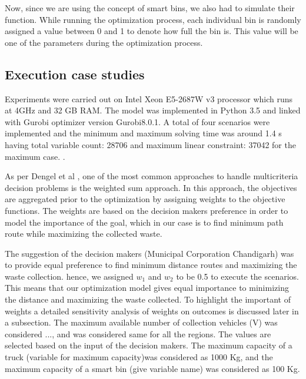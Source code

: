 \documentclass[12pt]{article}
\begin{document}
Now, since we are using the concept of smart bins, we also had to simulate their function. While running the optimization process, each individual bin is randomly assigned a value between 0 and 1 to denote how full the bin is. This value will be one of the parameters during the optimization process.

 
\subsection{Execution case studies}
Experiments were carried out on Intel Xeon E5-2687W v3 processor which runs at 4GHz and 32 GB RAM. The model was implemented in Python 3.5 and linked with Gurobi optimizer version Gurobi8.0.1. A total of four scenarios were implemented and the minimum and maximum solving time  was around 1.4 s having total variable count: 28706 and maximum linear constraint: 37042 for the maximum case. . 

As per Dengel et al \cite{degel2015time}, one of the most common approaches to handle multicriteria decision problems is the weighted sum approach. In this approach, the objectives are aggregated prior to the optimization by assigning weights to the objective functions. The weights are based on the decision makers preference in order to model the importance of the goal, which in our case is to find minimum path route while maximizing the collected waste. 

The suggestion of the decision makers (Municipal Corporation Chandigarh) was to provide equal preference to find minimum distance routes and maximizing the waste collection. hence, we assigned  $w_1$ and $w_2$ to be 0.5 to execute the scenarios. This means that our optimization model gives equal importance to minimizing the distance and maximizing the waste collected. To highlight the important of weights a detailed sensitivity analysis of weights on outcomes is discussed later in a subsection.
The maximum available number of collection vehicles (V) was considered ..., and was considered same for all the regions. The values are selected based on the input of the decision makers. The maximum capacity of a truck (variable for maximum capacity)was considered as 1000 Kg, and the maximum capacity of a smart bin (give variable name) was considered as 100 Kg.
\end{document}
